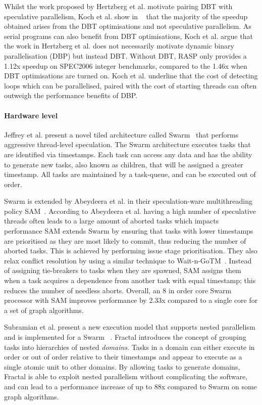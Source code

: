 Whilst the work proposed by Hertzberg et al. motivate pairing DBT with speculative parallelism, Koch et al. show in ~\cite{koch2013spec} that the majority of the speedup obtained arises from the DBT optimisations and not speculative parallelism.
As serial programs can also benefit from DBT optimisations, Koch et al. argue that the work in Hertzberg et al. does not necessarily motivate dynamic binary parallelisation (DBP) but instead DBT.
Without DBT, RASP only provides a 1.12x speedup on SPEC2006 integer benchmarks, compared to the 1.46x when DBT optimisations are turned on.
Koch et al. underline that the cost of detecting loops which can be parallelised, paired with the cost of starting threads can often outweigh the performance benefits of DBP.
 
\paragraph*{Hardware level}
Jeffrey et al. present a novel tiled architecture called Swarm~\cite{swarm2016} that performs aggressive thread-level speculation.
The Swarm architecture executes tasks that are identified via timestamps.
Each task can access any data and has the ability to generate new tasks, also known as children, that will be assigned a greater timestamp.
All tasks are maintained by a task-queue, and can be executed out of order.

Swarm is extended by Abeydeera et al. in their speculation-ware multithreading policy SAM~\cite{Abeydeera2017SpecMulti}.
According to Abeydeera et al. having a high number of speculative threads often leads to a large amount of aborted tasks which impacts performance
SAM extends Swarm by ensuring that tasks with lower timestamps are prioritised as they are most likely to commit, thus reducing the number of aborted tasks.
This is achieved by performing issue stage prioritisation.
They also relax conflict resolution by using a similar technique to Wait-n-GoTM~\cite{waitNGo2013}.
Instead of assigning tie-breakers to tasks when they are spawned, SAM assigns them when a task acquires a dependence from another task with equal timestamp; this reduces the number of needless aborts.
Overall, an 8 in order core Swarm processor with SAM improves performance by 2.33x compared to a single core for a set of graph algorithms.

Subramian et al. present a new execution model that supports nested parallelism and is implemented for a Swarm~\cite{fractal2017} .
Fractal introduces the concept of grouping tasks into hierarchies of nested \textit{domains}.
Tasks in a domain can either execute in order or out of order relative to their timestamps and appear to execute as a single atomic unit to other domains.
By allowing tasks to generate domains, Fractal is able to exploit nested parallelism without complicating the software, and can lead to a performance increase of up to 88x compared to Swarm on some graph algorithms.

